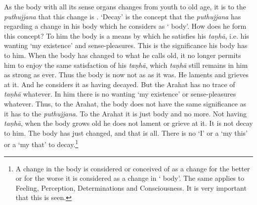 As the body with all its sense organs changes from youth to old age, it is to the \emph{puthujjana} that this change is . `Decay' is the concept that the \emph{puthujjana} has regarding a change in his body which he considers as ` body'. How does he form this concept? To him the body is a means by which he satisfies his \emph{taṇhā}, i.e. his wanting `my existence' and sense-pleasures. This is the significance his body has to him. When the body has changed to what he calls old, it no longer permits him to enjoy the same satisfaction of his \emph{taṇhā}, which \emph{taṇhā} still remains in him as strong as ever. Thus the body is now not as  as it was. He laments and grieves at it. And he considers it as having decayed. But the Arahat has no trace of \emph{taṇhā} whatever. In him there is no wanting `my existence' or sense-pleasures whatever. Thus, to the Arahat, the body does not have the same significance as it has to the \emph{puthujjana}. To the Arahat it is just body and no more. Not having \emph{taṇhā}, when the body grows old he does not lament or grieve at it. It is not decay to him. The body has just changed, and that is all. There is no `I' or a `my this' or a `my that' to decay.\footnote{A change in the body is considered or conceived of as a change for the better or for the worse  it is considered as a change in ` body'. The same applies to Feeling, Perception, Determinations and Consciousness. It is very important that this is seen.}

